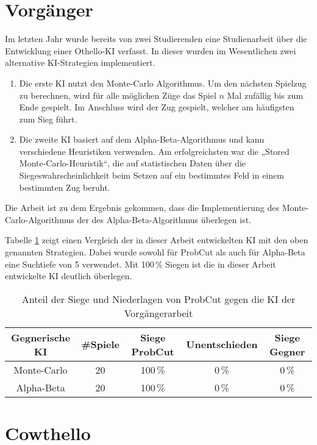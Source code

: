 
\section{Vorgänger}
Im letzten Jahr wurde bereits von zwei Studierenden eine Studienarbeit über die Entwicklung einer Othello-\ac{KI} verfasst.
In dieser wurden im Wesentlichen zwei alternative \ac{KI}-Strategien implementiert.
\begin{enumerate}
    \item Die erste \ac{KI} nutzt den Monte-Carlo Algorithmus. Um den nächsten Spielzug zu berechnen, wird für alle möglichen
    Züge das Spiel $n$ Mal zufällig bis zum Ende gespielt. Im Anschluss wird der Zug gespielt, welcher am häufigsten zum Sieg führt.
    \cite[S.~19]{othellostudienarbeit}
    \item Die zweite \ac{KI} basiert auf dem Alpha-Beta-Algorithmus und kann verschiedene Heuristiken verwenden. Am
    erfolgreichsten war die „Stored Monte-Carlo-Heuristik“, die auf statistischen Daten über die
    Siegeswahrscheinlichkeit beim Setzen auf ein bestimmtes Feld in einem bestimmten Zug beruht.
    \cite[S.~30]{othellostudienarbeit}
\end{enumerate}
Die Arbeit ist zu dem Ergebnis gekommen, dass die Implementierung des Monte-Carlo-Algorithmus der des
Alpha-Beta-Algorithmus überlegen ist.
\cite[S.~55]{othellostudienarbeit}

Tabelle \ref{table:comp:previous} zeigt einen Vergleich der in dieser Arbeit entwickelten \ac{KI} mit den oben genannten
Strategien. Dabei wurde sowohl für ProbCut als auch für Alpha-Beta eine Suchtiefe von 5 verwendet. Mit 100\,\% Siegen
ist die in dieser Arbeit entwickelte \ac{KI} deutlich überlegen.

\begin{table}[H]
\centering
\begin{tabular}{c|c|ccc}
\hline
Gegnerische \ac{KI} & \#Spiele & Siege ProbCut & Unentschieden & Siege Gegner \\
\hline
Monte-Carlo & 20 & 100\,\% & 0\,\% & 0\,\% \\
Alpha-Beta  & 20 & 100\,\% & 0\,\% & 0\,\% \\
\hline
\end{tabular}
\caption{Anteil der Siege und Niederlagen von ProbCut gegen die KI der Vorgängerarbeit}
\label{table:comp:previous}
\end{table}

\section{Cowthello}

